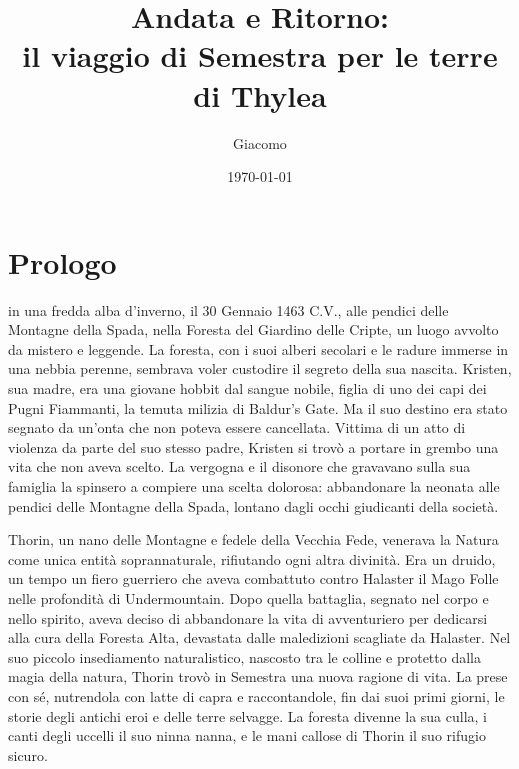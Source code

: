 \documentclass[letterpaper,twocolumn,openany,nodeprecatedcode]{dndbook}
\title{\sc Andata e Ritorno:\\ il viaggio di Semestra per le terre di Thylea}
\author{\sc Giacomo}
\date{\today}
\newcommand{\Cap}[2]{\DndDropCapLine{#1}{#2}}
\begin{document}
\frontmatter

\maketitle

\tableofcontents

\mainmatter%
\justifying
\chapter{Prologo}

\Cap{S}{emestra vide la luce} in una fredda alba d’inverno, il 30 Gennaio 1463 C.V., alle pendici delle Montagne della Spada, nella Foresta del Giardino delle Cripte, un luogo avvolto da mistero e leggende. La foresta, con i suoi alberi secolari e le radure immerse in una nebbia perenne, sembrava voler custodire il segreto della sua nascita. Kristen, sua madre, era una giovane hobbit dal sangue nobile, figlia di uno dei capi dei Pugni Fiammanti, la temuta milizia di Baldur's Gate. Ma il suo destino era stato segnato da un’onta che non poteva essere cancellata. Vittima di un atto di violenza da parte del suo stesso padre, Kristen si trovò a portare in grembo una vita che non aveva scelto. La vergogna e il disonore che gravavano sulla sua famiglia la spinsero a compiere una scelta dolorosa: abbandonare la neonata alle pendici delle Montagne della Spada, lontano dagli occhi giudicanti della società.

Thorin, un nano delle Montagne e fedele della Vecchia Fede, venerava la Natura come unica entità soprannaturale, rifiutando ogni altra divinità. Era un druido, un tempo un fiero guerriero che aveva combattuto contro Halaster il Mago Folle nelle profondità di Undermountain. Dopo quella battaglia, segnato nel corpo e nello spirito, aveva deciso di abbandonare la vita di avventuriero per dedicarsi alla cura della Foresta Alta, devastata dalle maledizioni scagliate da Halaster. Nel suo piccolo insediamento naturalistico, nascosto tra le colline e protetto dalla magia della natura, Thorin trovò in Semestra una nuova ragione di vita. La prese con sé, nutrendola con latte di capra e raccontandole, fin dai suoi primi giorni, le storie degli antichi eroi e delle terre selvagge. La foresta divenne la sua culla, i canti degli uccelli il suo ninna nanna, e le mani callose di Thorin il suo rifugio sicuro.
\end{document}
